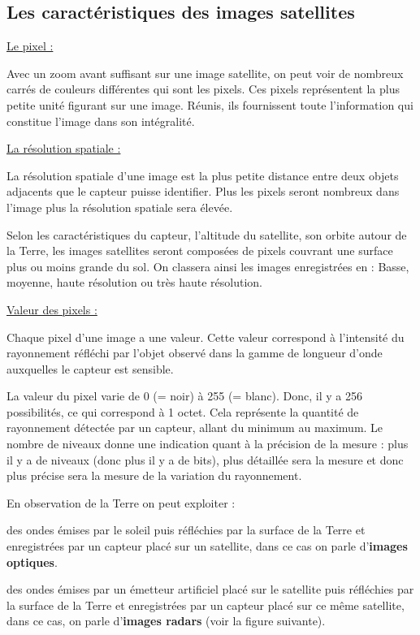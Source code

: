 \documentclass[12pt, openany]{report}
\begin{document}
\subsection{Les caractéristiques des images satellites}

\par
\underline{Le pixel :}
\par

Avec un zoom avant suffisant sur une image satellite, on peut voir de nombreux carrés de couleurs différentes qui sont les pixels.
Ces pixels représentent la plus petite unité figurant sur une image. Réunis, ils fournissent toute l’information qui constitue l’image dans son intégralité.

\par
\underline{La résolution spatiale :}
\par 

La résolution spatiale d’une image est la plus petite distance entre deux objets adjacents que le capteur puisse identifier.
Plus les pixels seront nombreux dans l’image plus la résolution spatiale sera élevée.
\par
Selon les caractéristiques du capteur, l’altitude du satellite, son orbite autour de la Terre, les images satellites seront composées de pixels couvrant une surface plus ou moins grande du sol. On classera ainsi les images enregistrées en : Basse, moyenne, haute résolution ou très haute résolution.

\par
\underline{Valeur des pixels :}
\par 

Chaque pixel d’une image a une valeur. Cette valeur correspond à l’intensité du rayonnement réfléchi par l’objet observé dans la gamme de longueur d’onde auxquelles le capteur est sensible. \cite{ref3}

La valeur du pixel varie de 0 (= noir) à 255 (= blanc). Donc, il y a 256 possibilités, ce qui correspond à 1 octet. Cela représente la quantité de rayonnement détectée par un capteur, allant du minimum au maximum. Le nombre de niveaux donne une indication quant à la précision de la mesure : plus il y a de niveaux (donc plus il y a de bits), plus détaillée sera la mesure et donc plus précise sera la mesure de la variation du rayonnement.

\par
En observation de la Terre on peut exploiter :
\begin{mylist}
\item
des ondes émises par le soleil puis réfléchies par la surface de la Terre et enregistrées par un capteur placé sur un satellite, dans ce cas  on parle d'\textbf{images optiques}.
\item
des ondes émises par un émetteur artificiel placé sur le satellite puis réfléchies par la surface de la Terre et enregistrées par un capteur placé sur ce même satellite, dans ce cas, on parle d'\textbf{images radars} (voir la figure suivante).
\end{mylist}
\end{document}
